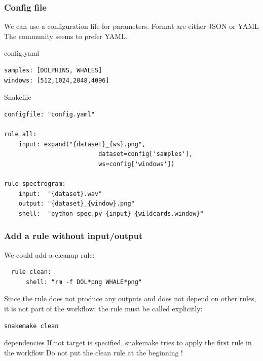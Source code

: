 \documentclass{beamer}
\begin{document}
\begin{frame}[fragile]
    \frametitle{Config file}
     We can use a configuration file for parameters. Format are either JSON or YAML
    The community seems to prefer YAML.
    
    \begin{block}{config.yaml}
        \begin{lstlisting}
samples: [DOLPHINS, WHALES]
windows: [512,1024,2048,4096]
        \end{lstlisting}
    \end{block}
    \begin{block}{Snakefile}
    \begin{lstlisting}
configfile: "config.yaml"

rule all:
    input: expand("{dataset}_{ws}.png", 
                          dataset=config['samples'], 
                          ws=config['windows'])

rule spectrogram:
    input:  "{dataset}.wav"
    output: "{dataset}_{window}.png"    
    shell:  "python spec.py {input} {wildcards.window}"
    \end{lstlisting}
    \end{block}
\end{frame}


\begin{frame}[fragile]
 \frametitle{Add a rule without input/output}
 
 We could add a cleanup rule:
 
 \begin{block}{}
 \begin{lstlisting}
  rule clean:
      shell: "rm -f DOL*png WHALE*png"
    \end{lstlisting}
 \end{block}

 Since the rule does not produce any outputs and does not depend on other rules, 
 it is not part of the workflow: the rule must be called explicitly:
 
 
 \begin{block}{}
 \begin{lstlisting}[language=bash]
 snakemake clean
 \end{lstlisting}
 \end{block}
 
 \begin{alertblock}{dependencies}
  If not target is specified, snakemake tries to apply the first rule in the workflow
  Do not put the clean rule at the beginning !
 \end{alertblock} 
\end{frame}
\end{document}
